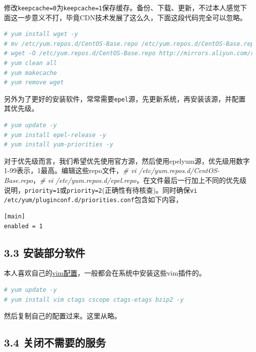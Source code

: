 \documentclass[doctor,openright,twoside]{sjtuthesis}
\newcommand{\passthrough}[1]{#1}
\theoremstyle{plain}
\theoremstyle{definition}
\theoremstyle{remark}
\theoremstyle{ocrenumbox}
\theoremstyle{plain}
\begin{document}
修改\passthrough{\lstinline!keepcache=0!}为\passthrough{\lstinline!keepcache=1!}保存缓存。备份、下载、更新，不过本人感觉下面这一步意义不打，毕竟CDN技术发展了这么久，下面这段代码完全可以忽略。

\begin{lstlisting}[language=bash]
# yum install wget -y
# mv /etc/yum.repos.d/CentOS-Base.repo /etc/yum.repos.d/CentOS-Base.repo.backup
# wget -O /etc/yum.repos.d/CentOS-Base.repo http://mirrors.aliyun.com/repo/Centos-7.repo
# yum clean all
# yum makecache
# yum remove wget
\end{lstlisting}

另外为了更好的安装软件，常常需要\passthrough{\lstinline!epel!}源，先更新系统，再安装该源，并配置其优先级。

\begin{lstlisting}[language=bash]
# yum update -y
# yum install epel-release -y
# yum install yum-priorities -y
\end{lstlisting}

对于优先级而言，我们希望优先使用官方源，然后使用epelyum源，优先级用数字1-99表示，1最高。编辑这些repo文件，\emph{\# vi /etc/yum.repos.d/CentOS-Base.repo}，\emph{\# vi /etc/yum.repos.d/epel.repo}，在文件最后一行加上不同的优先级说明，\passthrough{\lstinline!priority=1!}或\passthrough{\lstinline!priority=2!}(正确性有待核查)。同时确保\passthrough{\lstinline!vi /etc/yum/pluginconf.d/priorities.conf!}包含如下内容，

\begin{lstlisting}
[main]
enabled = 1
\end{lstlisting}

\hypertarget{section-133}{%
\subsection{3.3 安装部分软件}\label{section-133}}

本人喜欢自己的\href{https://my.oschina.net/bubifengyun/blog/163516}{vim配置}，一般都会在系统中安装这些vim插件的。

\begin{lstlisting}[language=bash]
# yum update -y
# yum install vim ctags cscope ctags-etags bzip2 -y
\end{lstlisting}

然后复制自己的配置过来。这里从略。

\hypertarget{section-134}{%
\subsection{3.4 关闭不需要的服务}\label{section-134}}
\end{document}
